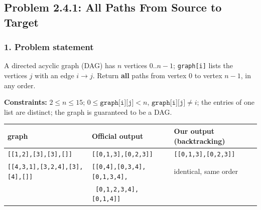 \subsection{Problem 2.4.1: All Paths From Source to Target}


\subsubsection*{1. Problem statement}

A directed acyclic graph (DAG) has $n$ vertices $0..n-1$; \texttt{graph[i]} lists the vertices $j$ with an edge $i \to j$. Return \textbf{all} paths from vertex $0$ to vertex $n-1$, in any order.

\textbf{Constraints:} $2 \le n \le 15$; $0 \le \texttt{graph[i][j]} < n$, $\texttt{graph[i][j]} \ne i$; the entries of one list are distinct; the graph is guaranteed to be a DAG.

\begin{table}[H]
\centering\small
\begin{tabular}{@{}lll@{}}
\toprule
\textbf{graph} & \textbf{Official output} & \textbf{Our output (backtracking)} \\
\midrule
\texttt{[[1,2],[3],[3],[]]} & \texttt{[[0,1,3],[0,2,3]]} & \texttt{[[0,1,3],[0,2,3]]} \\
\texttt{[[4,3,1],[3,2,4],[3],[4],[]]} & \texttt{[[0,4],[0,3,4],[0,1,3,4],} & identical, same order \\
 & \texttt{\ [0,1,2,3,4],[0,1,4]]} & \\
\bottomrule
\end{tabular}
\end{table}

